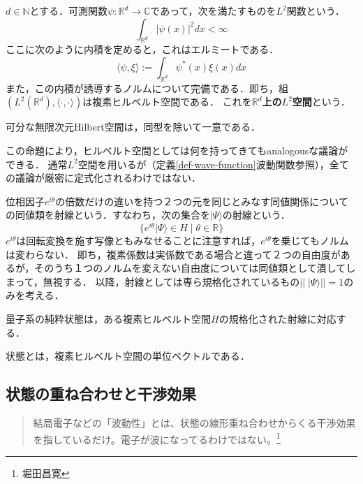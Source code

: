 \documentclass[uplatex, dvipdfmx]{jsreport}
\begin{document}
\begin{definition}[$L^2$空間]
    $d\in\mathbb{N}$とする．可測関数$\psi:\mathbb{R}^d\to\mathbb{C}$であって，次を満たすものを$L^2$関数という．
    \[ \int_{\mathbb{R}^d}|\psi(x)|^2dx<\infty \]
    ここに次のように内積を定めると，これはエルミートである．
    \[ \langle\psi,\xi\rangle:=\int_{\mathbb{R}^d}\psi^*(x)\xi(x)dx \]
    また，この内積が誘導するノルムについて完備である．即ち，組$(L^2(\mathbb{R}^d),\langle\cdot,\cdot\rangle)$は複素ヒルベルト空間である．
    これを\textbf{$\mathbb{R}^d$上の$L^2$空間}という．
\end{definition}

\begin{proposition}
    可分な無限次元Hilbert空間は，同型を除いて一意である．
\end{proposition}
\begin{remark}
    この命題により，ヒルベルト空間としては何を持ってきてもanalogousな議論ができる．
    通常$L^2$空間を用いるが（定義\ref{def-wave-function}波動関数参照），全ての議論が厳密に定式化されるわけではない．
\end{remark}

\begin{definition}[射線]
    位相因子$e^{i\theta}$の倍数だけの違いを持つ２つの元を同じとみなす同値関係についての同値類を射線という．すなわち，次の集合を$|\Psi\rangle$の射線という．
    \[ \{ e^{i\theta}|\Psi\rangle\in H\mid\theta\in\mathbb{R}  \} \]
    $e^{i\theta}$は回転変換を施す写像ともみなせることに注意すれば，$e^{i\theta}$を乗じてもノルムは変わらない．
    即ち，複素係数は実係数である場合と違って２つの自由度があるが，そのうち１つのノルムを変えない自由度については同値類として潰してしまって，無視する．
    以降，射線としては専ら規格化されているもの$||\;|\Psi\rangle||=1$のみを考える．
\end{definition}

\begin{axiom}[状態ベクトル]\label{postulate-state-vector}
    量子系の純粋状態は，ある複素ヒルベルト空間$H$の規格化された射線に対応する．

    状態とは，複素ヒルベルト空間の単位ベクトルである．
\end{axiom}

\subsection{状態の重ね合わせと干渉効果}

\begin{quote}
    結局電子などの「波動性」とは、状態の線形重ね合わせからくる干渉効果を指しているだけ。電子が波になってるわけではない。\footnote{堀田昌寛}
\end{quote}
\end{document}
